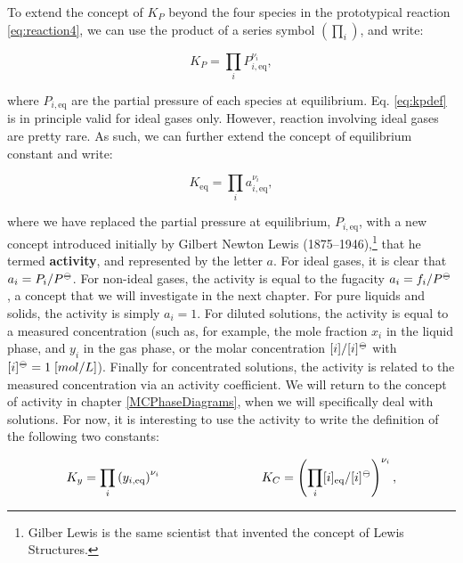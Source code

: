 \documentclass[
  9pt,
]{extbook}
\theoremstyle{definition}
\theoremstyle{definition}
\theoremstyle{definition}
\theoremstyle{remark}
\begin{document}
To extend the concept of \(K_P\) beyond the four species in the prototypical reaction \eqref{eq:reaction4}, we can use the product of a series symbol \(\left( \prod_i \right)\), and write:

\begin{equation}
K_P=\prod_i P_{i,\text{eq}}^{\nu_i},
\label{eq:kpdef}
\end{equation}

where \(P_{i,\text{eq}}\) are the partial pressure of each species at equilibrium. Eq. \eqref{eq:kpdef} is in principle valid for ideal gases only. However, reaction involving ideal gases are pretty rare. As such, we can further extend the concept of equilibrium constant and write:

\begin{equation}
K_{\text{eq}} =\prod_i a_{i,\text{eq}}^{\nu_i},
\label{eq:kdef}
\end{equation}

where we have replaced the partial pressure at equilibrium, \(P_{i,\text{eq}}\), with a new concept introduced initially by Gilbert Newton Lewis (1875--1946),\footnote{Gilber Lewis is the same scientist that invented the concept of Lewis Structures.} that he termed \textbf{activity}, and represented by the letter \(a\). For ideal gases, it is clear that \(a_i=P_i/P^{-\kern-6pt{\ominus}\kern-6pt-}\). For non-ideal gases, the activity is equal to the fugacity \(a_i=f_i/P^{-\kern-6pt{\ominus}\kern-6pt-}\), a concept that we will investigate in the next chapter. For pure liquids and solids, the activity is simply \(a_i=1\). For diluted solutions, the activity is equal to a measured concentration (such as, for example, the mole fraction \(x_i\) in the liquid phase, and \(y_i\) in the gas phase, or the molar concentration \([i]/[i]^{-\kern-6pt{\ominus}\kern-6pt-}\) with \([i]^{-\kern-6pt{\ominus}\kern-6pt-}= 1\;\text[mol/L]\)). Finally for concentrated solutions, the activity is related to the measured concentration via an activity coefficient. We will return to the concept of activity in chapter \ref{MCPhaseDiagrams}, when we will specifically deal with solutions. For now, it is interesting to use the activity to write the definition of the following two constants:

\begin{equation}
K_y =\prod_i \left( y_{i,\text{eq}} \right)^{\nu_i} \qquad \qquad \qquad \qquad K_C =\left( \prod_i [i]_{\text{eq}}/[i]^{-\kern-6pt{\ominus}\kern-6pt-}\right)^{\nu_i},
\label{eq:kxkcdef}
\end{equation}
\end{document}
